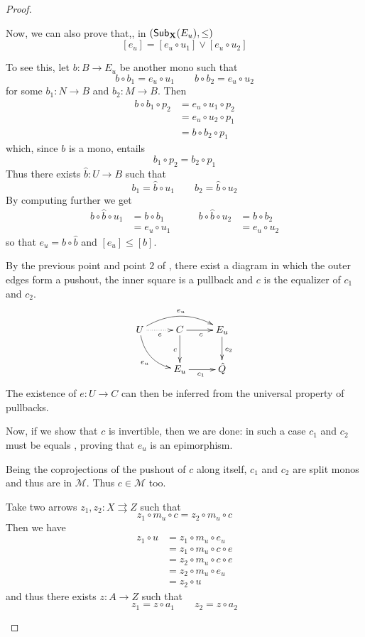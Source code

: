 \begin{proof}
\begin{enumerate}
		Now, we can also prove that,, in $(\mathsf{Sub}_{\textbf {\textup{X}}}(E_u), \leq)$ 
		\[[e_u]=[e_u\circ u_1]\vee [e_u\circ u_2]\]
		
		To see this, let  $b\colon B\to E_u$ be another mono such that 
		\[b\circ b_1 =e_u\circ u_1 \qquad b\circ b_2 =e_u\circ u_2\] 
		for some $b_1\colon N\to B$ and $b_2\colon M\to B$. Then 
		\begin{align*}
			b \circ b_1 \circ p_2 & = e_u \circ u_1\circ p_2\\&= e_u \circ  u_2\circ p_1\\&=b\circ b_2\circ p_1
		\end{align*}
		which, since $b$ is a mono, entails
		\[b_1\circ  p_2 =  b_2\circ p_1\]
		Thus there exists $\hat{b}\colon U\to B$ such that
		\[b_1 =\hat{b} \circ u_1 \qquad b_2=\hat{b}\circ u_2\]
		By computing further we get
		\[\begin{split}
			b\circ \hat{b} \circ u_1 &=b\circ b_1 \\&=e_u\circ u_1 
		\end{split}\qquad \begin{split}
			b\circ \hat{b} \circ u_2 &=b\circ b_2 \\&=e_u\circ u_2 
		\end{split}\]
	so that $e_u=b\circ \hat{b}$ and $[e_u] \leq [b]$. 
	
	By the previous point and point $2$ of , there exist a diagram in which the outer edges form a pushout, the inner square is a pullback  and $c$ is the equalizer of $c_1$ and $c_2$.
		\[\xymatrix{U  \ar@/^.5cm/[rr]^{e_u} \ar@/_.4cm/[dr]_{e_u}  \ar@{.>}[r]_{e}& C \ar[d]_{c} \ar[r]_{c} & E_u \ar[d]^{c_2} \\  & E_u \ar[r]_{c_1} & \hat{Q}}\]
		The existence of $e\colon U\to C$ can then be inferred from the universal property of pullbacks.
		
		Now, if we show that $c$ is invertible, then we are done: in such a case $c_1$ and $c_2$ must be equals , proving that $e_u$ is an epimorphism.  
		
		Being the coprojections of the pushout of $c$ along itself,  $c_1$ and $c_2$ are split monos and thus are in $\mathcal{M}$. Thus $c\in \mathcal{M}$ too. 
		
		Take two arrows $z_1, z_2\colon X\rightrightarrows Z $ such that
		\[z_1\circ m_u\circ c=z_2\circ m_u \circ c\]
			Then we have
		\begin{align*}
			z_1\circ u &= z_1\circ m_u\circ e_u \\&= z_1\circ m_u\circ c \circ e \\&= z_2\circ m_u\circ c \circ e \\&= z_2\circ m_u \circ e_u\\&= z_2\circ u 
		\end{align*}
		and thus there exists $z\colon A\to Z$ such that 
		\[z_1= z\circ a_1\qquad z_2=z\circ a_2\]
		

\end{enumerate}
\end{proof}
